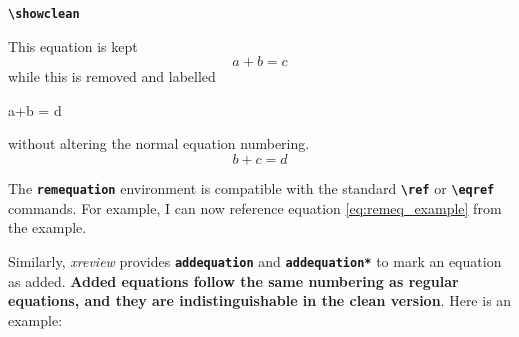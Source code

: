 \documentclass[a4paper]{ltxdoc}
\newcommand{\writecommand}[1]{\texttt{\textbf{{\textbackslash#1}}}}
\newcommand{\writeenv}[1]{\texttt{\textbf{{#1}}}}
\begin{document}
\begin{center}
\begin{minipage}[t]{0.3\linewidth}
    \end{minipage}
    \hfill
    \begin{minipage}[t]{0.3\linewidth}   
    \writecommand{showclean}
    \showclean
    
    This equation is kept
    \begin{equation}
        a+b = c
    \end{equation}
    while this is removed and labelled
    \begin{remequation}
        a+b = d
    \end{remequation}
    without altering the normal equation numbering.
    \begin{equation}
        b+c = d
    \end{equation}\addtocounter{equation}{-2}

\end{minipage}
\end{center}
\showchanges

The \writeenv{remequation} environment is compatible with the standard \writecommand{ref} or \writecommand{eqref} commands. For example, I can now reference equation \ref{eq:remeq_example} from the example.

Similarly, \textit{xreview} provides \writeenv{addequation} and \writeenv{addequation*} to mark an equation as added. \textbf{Added equations follow the same numbering as regular equations, and they are indistinguishable in the clean version}. Here is an example:
\end{document}
